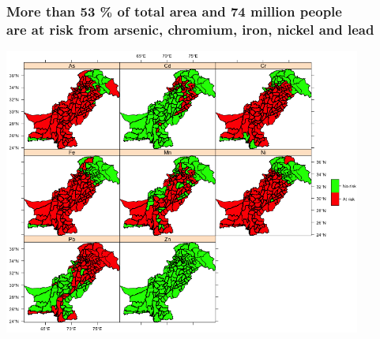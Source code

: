 \documentclass[10pt, compress]{beamer}
\begin{document}
\begin{frame}[fragile]
  \frametitle{More than 53 \% of total area and 74 million people \protect\\ are at risk from arsenic, chromium, iron, nickel and lead}

  \includegraphics[width=0.88\textwidth]{images/Ground_water_risk.png}
\end{frame}
\end{document}
